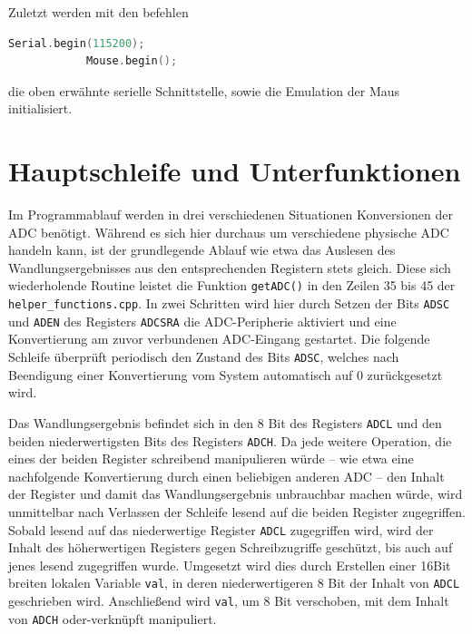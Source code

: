 		Zuletzt werden mit den befehlen
		\begin{lstlisting}[language=C++]
			Serial.begin(115200);
			Mouse.begin();
		\end{lstlisting}
		die oben erwähnte serielle Schnittstelle, sowie die Emulation der Maus initialisiert.

	\section{Hauptschleife und Unterfunktionen}
		Im Programmablauf werden in drei verschiedenen Situationen Konversionen der ADC benötigt.
		Während es sich hier durchaus um verschiedene physische ADC handeln kann, ist der grundlegende Ablauf wie etwa das Auslesen des Wandlungsergebnisses aus den entsprechenden Registern stets gleich.
		Diese sich wiederholende Routine leistet die Funktion \texttt{getADC()} in den Zeilen 35 bis 45 der \texttt{helper\_functions.cpp}.
		In zwei Schritten wird hier durch Setzen der Bits \texttt{ADSC} und \texttt{ADEN} des Registers \texttt{ADCSRA} die ADC-Peripherie aktiviert und eine Konvertierung am zuvor verbundenen ADC-Eingang gestartet.
		Die folgende Schleife überprüft periodisch den Zustand des Bits \texttt{ADSC}, welches nach Beendigung einer Konvertierung vom System automatisch auf 0 zurückgesetzt wird.\par
		Das Wandlungsergebnis befindet sich in den 8 Bit des Registers \texttt{ADCL} und den beiden niederwertigsten Bits des Registers \texttt{ADCH}.
		Da jede weitere Operation, die eines der beiden Register schreibend manipulieren würde -- wie etwa eine nachfolgende Konvertierung durch einen beliebigen anderen ADC -- den Inhalt der Register und damit das Wandlungsergebnis unbrauchbar machen würde, wird unmittelbar nach Verlassen der Schleife lesend auf die beiden Register zugegriffen.
		Sobald lesend auf das niederwertige Register \texttt{ADCL} zugegriffen wird, wird der Inhalt des höherwertigen Registers gegen Schreibzugriffe geschützt, bis auch auf jenes lesend zugegriffen wurde.
		Umgesetzt wird dies durch Erstellen einer 16Bit breiten lokalen Variable \texttt{val}, in deren niederwertigeren 8 Bit der Inhalt von \texttt{ADCL} geschrieben wird.
		Anschließend wird \texttt{val}, um 8 Bit verschoben, mit dem Inhalt von \texttt{ADCH} oder-verknüpft manipuliert.

